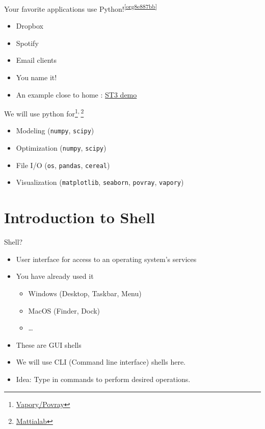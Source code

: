 \documentclass[presentation]{beamer}
\begin{document}
\begin{frame}[label={sec:org858373d}]{Your favorite applications use Python!\textsuperscript{\ref{org8e887bb}}}
\begin{itemize}
\item Dropbox
\item Spotify
\item Email clients
\item You name it!
\item An example close to home : \href{code/clangformat.cpp}{ST3 demo}
\end{itemize}
\end{frame}

\begin{frame}[label={sec:org7758ffa},fragile]{We will use python for\footnote{\href{https://zulko.github.io/blog/2014/11/13/things-you-can-do-with-python-and-pov-ray/\#disqus\_thread}{Vapory/Povray}}\textsuperscript{,}\,\footnote{\href{http://mattia-lab.com/work/soft-filaments/}{Mattialab}}}
 \begin{itemize}
\item Modeling (\texttt{numpy}, \texttt{scipy})
\item Optimization (\texttt{numpy}, \texttt{scipy})
\item File I/O (\texttt{os}, \texttt{pandas}, \texttt{cereal})
\item Visualization (\texttt{matplotlib}, \texttt{seaborn}, \texttt{povray}, \texttt{vapory})
\end{itemize}
\end{frame}

\section{Introduction to Shell}
\label{sec:org80310dc}
\begin{frame}[label={sec:org2e31a82}]{Shell?}
\begin{itemize}
\item User interface for access to an operating system's services
\item You have already used it
\begin{itemize}
\item Windows (Desktop, Taskbar, Menu)
\item MacOS (Finder, Dock)
\item \ldots{}
\end{itemize}
\item These are GUI shells
\item We will use CLI (Command line interface) shells here.
\item Idea: Type in commands to perform desired operations.
\end{itemize}
\end{frame}
\end{document}
